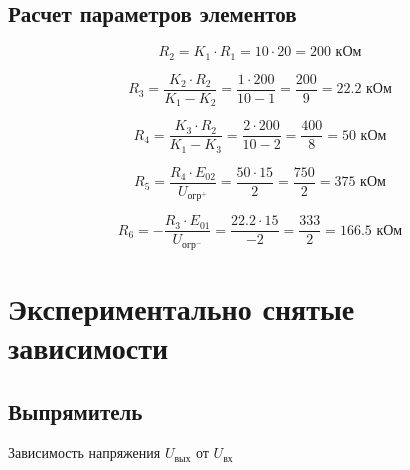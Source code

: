 \subsection{Расчет параметров элементов}

\begin{displaymath}
	R_2 = K_1 \cdot R_1 = 10 \cdot 20 = 200 \text{ кОм}
\end{displaymath}

\begin{displaymath}
	R_3 = \frac{K_2 \cdot R_2}{K_1 - K_2} = \frac{1 \cdot 200}{10 - 1} = \frac{200}{9} = 22.2 \text{ кОм}
\end{displaymath}

\begin{displaymath}
	R_4 = \frac{K_3 \cdot R_2}{K_1 - K_3} = \frac{2 \cdot 200}{10 - 2} = \frac{400}{8} = 50 \text{ кОм}
\end{displaymath}

\begin{displaymath}
	R_5 = \frac{R_4 \cdot E_{02}}{U_{\text{огр}^{+}}} = \frac{50 \cdot 15}{2} = \frac{750}{2} = 375 \text{ кОм}
\end{displaymath}

\begin{displaymath}
	R_6 = -\frac{R_3 \cdot E_{01}}{U_{\text{огр}^{-}}} = \frac{22.2 \cdot 15}{-2} = \frac{333}{2} = 166.5 \text{ кОм}
\end{displaymath}

\section{Экспериментально снятые зависимости}

\subsection{Выпрямитель}

\begin{table}[H]
\begin{center}
	\caption{Зависимость напряжения $U_\text{вых}$ от $U_\text{вх}$}
	\label{tab:k_dc}
	\def\tabcolsep{30pt}
	\def\arraystretch{1.2}
	\fontsize{13}{14}\selectfont
\end{center}
\end{table}

